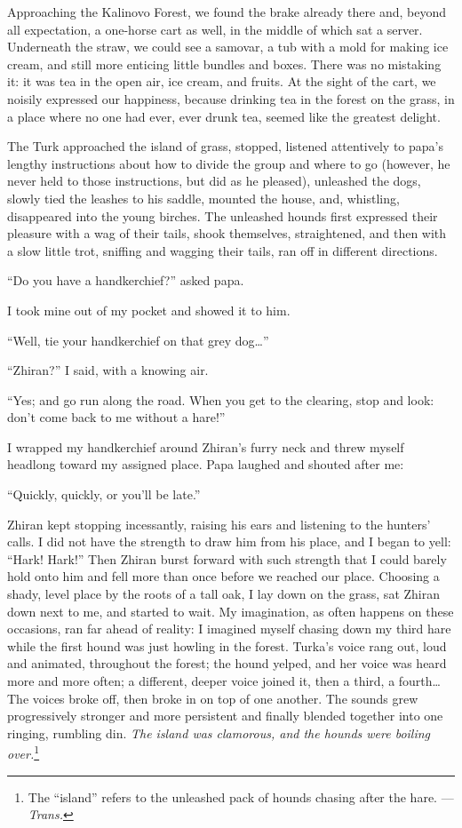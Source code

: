 Approaching the Kalinovo Forest,  we found the brake already there and, beyond all expectation, a one-horse cart as well, in the middle of which sat a server. Underneath the straw, we could see a samovar, a tub with a mold for making ice cream, and still more enticing little bundles and boxes. There was no mistaking it: it was tea in the open air, ice cream, and fruits. At the sight of the cart, we noisily expressed our happiness, because drinking tea in the forest on the grass, in a place where no one had ever, ever drunk tea, seemed like the greatest delight.

The Turk approached the island of grass, stopped, listened attentively to papa's lengthy instructions about how to divide the group and where to go (however, he never held to those instructions, but did as he pleased), unleashed the dogs, slowly tied the leashes to his saddle, mounted the house, and, whistling, disappeared into the young birches. The unleashed hounds first expressed their pleasure with a wag of their tails, shook themselves, straightened, and then with a slow little trot, sniffing and wagging their tails, ran off in different directions.

``Do you have a handkerchief?'' asked papa. %

I took mine out of my pocket and showed it to him.

``Well, tie your handkerchief on that grey dog\ldots{}'' %

``Zhiran?'' I said, with a knowing air. %

``Yes; and go run along the road. When you get to the clearing, stop and look: don't come back to me without a hare!'' %

I wrapped my handkerchief around Zhiran's furry neck and threw myself headlong toward my assigned place. Papa laughed and shouted after me:

``Quickly, quickly, or you'll be late.'' %

Zhiran kept stopping incessantly, raising his ears and listening to the hunters' calls. I did not have the strength to draw him from his place, and I began to yell: ``Hark! Hark!'' Then Zhiran burst forward with such strength that I could barely hold onto him and fell more than once before we reached our place. Choosing a shady, level place by the roots of a tall oak, I lay down on the grass, sat Zhiran down next to me, and started to wait. My imagination, as often happens on these occasions, ran far ahead of reality: I imagined myself chasing down my third hare while the first hound was just howling in the forest. Turka's voice rang out, loud and animated, throughout the forest; the hound yelped, and her voice was heard more and more often; a different, deeper voice joined it, then a third, a fourth\ldots{} The voices broke off, then broke in on top of one another. The sounds grew progressively stronger and more persistent and finally blended together into one ringing, rumbling din.  \textit{The island was clamorous, and the hounds were boiling over.}\footnote{The ``island'' refers to the unleashed pack of hounds chasing after the hare. --- \textit{Trans.}}

